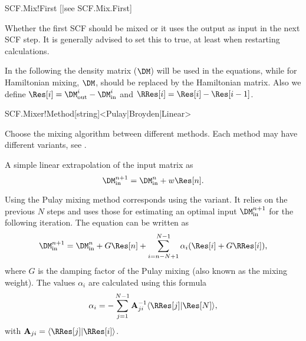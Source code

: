 \begin{fdflogicalT}{SCF.Mix!First}
  [|see SCF.Mix.First]

  Whether the first SCF should be mixed or it uses the output as input
  in the next SCF step. It is generally advised to set this to true,
  at least when restarting calculations.
  
\end{fdflogicalT}


In the following the density matrix ($\DM$) will be used in the
equations, while for Hamiltonian mixing, $\DM$, should be replaced by
the Hamiltonian matrix.
%
Also we define $\Res[i] = \DM^i_{\mathrm{out}} - \DM^i_{\mathrm{in}}$ and 
$\RRes[i] = \Res[i] - \Res[i-1]$.

\begin{fdfentry}{SCF.Mixer!Method}[string]<Pulay|Broyden|Linear>

  Choose the mixing algorithm between different methods. Each method
  may have different variants, see .
  
  \begin{fdfoptions}

    \option[Linear] %
    A simple linear extrapolation of the input matrix as
    \begin{equation}
      \DM^{n+1}_{\mathrm{in}} = \DM^n_{\mathrm{in}} + w \Res[n].
    \end{equation}


    \option[Pulay] %
    Using the Pulay mixing method corresponds using the
    \cite{Kresse1996} variant. It relies on the previous $N$ steps and
    uses those for estimating an optimal input
    $\DM^{n+1}_{\mathrm{in}}$ for the following iteration. The
    equation can be written as
    \begin{equation}
      \DM^{n+1}_{\mathrm{in}} = \DM^n_{\mathrm{in}} + G \Res[n]
      + \sum_{i=n-N+1}^{N-1} \alpha_i (\Res[i] + G \RRes[i]),
    \end{equation}
    where $G$ is the damping factor of the Pulay mixing (also known as
    the mixing weight).
    The values $\alpha_i$ are calculated using this formula
    \begin{equation}
      \alpha_i = - \sum_{j=1}^{N-1}\mathbf A_{ji}^{-1} 
         \langle \RRes[j] | \Res[N] \rangle,
    \end{equation}    
    with $\mathbf A_{ji} = \langle \RRes[j] | \RRes[i] \rangle$.


\end{fdfoptions}
\end{fdfentry}
